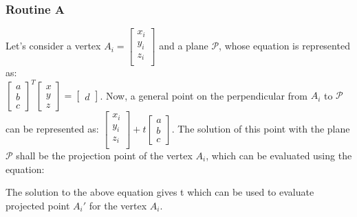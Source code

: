 \documentclass[12pt]{report}
\begin{document}
\subsubsection*{Routine A}
Let's consider a vertex \(A_{i} = \begin{bmatrix} x_{i} \\ y_{i} \\ z_{i} \\ \end{bmatrix}\) and a plane \(\mathcal{P} \), whose equation is represented as: \\ 
\(\begin{bmatrix} a \\ b \\ c \end{bmatrix}^{T} \begin{bmatrix} x \\ y \\ z \end{bmatrix} = \begin{bmatrix} d \end{bmatrix}\). Now, a general point on the perpendicular from \(A_{i} \) to \(\mathcal{P} \) can be represented as: \(\begin{bmatrix}  x_{i} \\ y_{i} \\ z_{i} \\ \end{bmatrix} + t \begin{bmatrix} a \\ b \\ c \end{bmatrix} \). The solution of this point with the plane \(\mathcal{P} \) shall be the projection point of the vertex \(A_{i} \), which can be evaluated using the equation: \\
\begin{center}
\end{center}
The solution to the above equation gives t which can be used to evaluate projected point \(
A_{i}' \) for the vertex \(A_{i}\).
\end{document}
